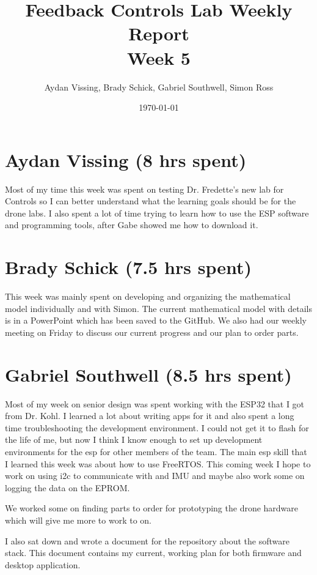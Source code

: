 \documentclass[12pt, titlepage]{article}
\title{Feedback Controls Lab Weekly Report \\ \normalsize{Week 5}}
\author{Aydan Vissing, Brady Schick, Gabriel Southwell, Simon Ross}
\date{\today}
\begin{document}
\maketitle

\section*{Aydan Vissing (8 hrs spent)}

Most of my time this week was spent on testing Dr. Fredette’s new lab for Controls so I can better understand what the learning goals should be for the drone labs. I also spent a lot of time trying to learn how to use the ESP software and programming tools, after Gabe showed me how to download it. 

\section*{Brady Schick (7.5 hrs spent)}

This week was mainly spent on developing and organizing the mathematical model individually and with Simon. The current mathematical model with details is in a PowerPoint which has been saved to the GitHub. We also had our weekly meeting on Friday to discuss our current progress and our plan to order parts.

\section*{Gabriel Southwell (8.5 hrs spent)}

Most of my week on senior design was spent working with the ESP32 that I got from Dr. Kohl. I learned a lot about writing apps for it and also spent a long time troubleshooting the development environment. I could not get it to flash for the life of me, but now I think I know enough to set up development environments for the esp for other members of the team. The main esp skill that I learned this week was about how to use FreeRTOS. This coming week I hope to work on using i2c to communicate with and IMU and maybe also work some on logging the data on the EPROM.

We worked some on finding parts to order for prototyping the drone hardware which will give me more to work to on.

I also sat down and wrote a document for the repository about the software stack. This document contains my current, working plan for both firmware and desktop application.
\end{document}
